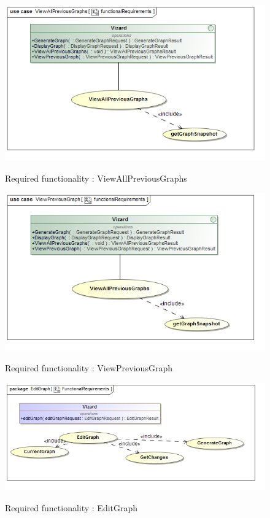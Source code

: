 \documentclass[a4paper,12pt]{article}
\begin{document}
	\begin{figure}[H]
		\includegraphics[width=\textwidth]{Images/uc__ViewAllPreviousGraphs__functionalRequirements.png}  \\
		\caption{Required functionality : ViewAllPreviousGraphs}
	\end{figure}
	\begin{figure}[H]
		\includegraphics[width=\textwidth]{Images/uc__ViewPreviousGraph__functionalRequirements.png}  \\
		\caption{Required functionality : ViewPreviousGraph}
	\end{figure}	
	
	\begin{figure}[H]
		\includegraphics[width=\textwidth]{Images/uc__EditGraph}  \\
		\caption{Required functionality : EditGraph}
	\end{figure}
	
\end{document}
